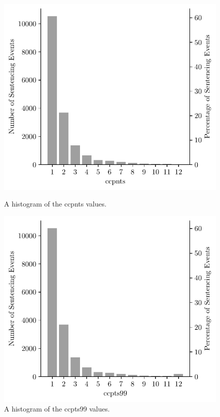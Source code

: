 \documentclass[11pt, oneside]{article}   	%
\theoremstyle{ModifiedStyle}
\begin{document}
\begin{figure}[h!]
	\centering
	\begin{minipage}{.45\textwidth}
		\centering
		\hspace{-4mm}
		\includegraphics[scale=0.75]{Figures/ccpnts_Histogram}
		\hspace{4mm}
		\vspace{-6.0mm}
		\caption{A histogram of the ccpnts values.}
		\label{Figure_Hester_Data_ccpnts_Histogram}
	\end{minipage}
	\hspace{5mm}
	\begin{minipage}{0.45\textwidth}
		\centering
		\hspace{-3mm}
		\includegraphics[scale=0.75]{Figures/ccpts99_Histogram}
		\vspace{-6mm}
		\caption{A histogram of the ccpts99 values.}
		\label{Figure_Hester_Data_ccpts99_Histogram}
	\end{minipage}
\end{figure}
\end{document}
